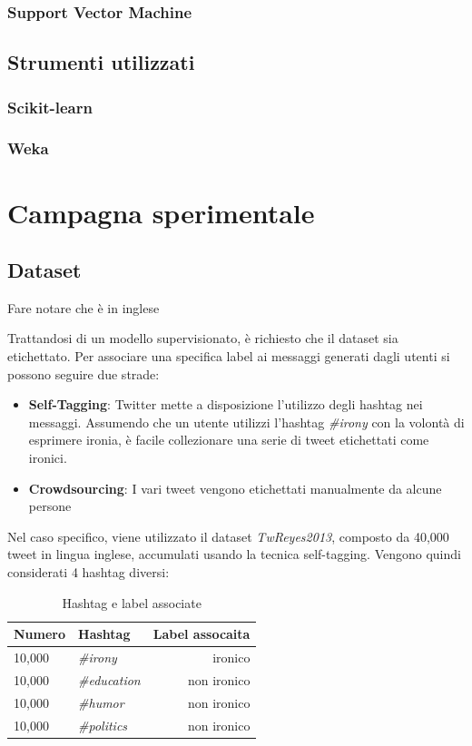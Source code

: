 \documentclass[oneside]{book}
\begin{document}
\subsection{Support Vector Machine}


\section{Strumenti utilizzati}
\subsection{Scikit-learn}
\subsection{Weka}




\chapter{Campagna sperimentale}

\section{Dataset}
Fare notare che è in inglese

Trattandosi di un modello supervisionato, è richiesto che il dataset sia etichettato. Per associare una specifica label ai messaggi generati dagli utenti si possono seguire due strade:

\begin{itemize}
	\item \textbf{Self-Tagging}:
	\label{chap:self-taggin}
	Twitter mette a disposizione l'utilizzo degli hashtag nei messaggi. Assumendo che un utente utilizzi l'hashtag \emph{\#irony} con la volontà di esprimere ironia, è facile collezionare una serie di tweet etichettati come ironici.
	
	\item \textbf{Crowdsourcing}:	
	I vari tweet vengono etichettati manualmente da alcune persone
\end{itemize}

Nel caso specifico, viene utilizzato il dataset \emph{TwReyes2013}, composto da 40,000 tweet in lingua inglese, accumulati usando la tecnica self-tagging. Vengono quindi considerati 4 hashtag diversi:


\begin{table}[ht]
	\centering
	\begin{tabular}[t]{llr}
		\hline
		\textbf{Numero} & \textbf{Hashtag}  & \textbf{Label assocaita}\\
		\hline
		10,000 & \emph{\#irony}     & ironico     \\
		10,000 & \emph{\#education} & non ironico \\
		10,000 & \emph{\#humor}     & non ironico \\
		10,000 & \emph{\#politics}  & non ironico \\
		\hline
	\end{tabular}
	\caption{Hashtag e label associate}
\end{table}%
\end{document}
